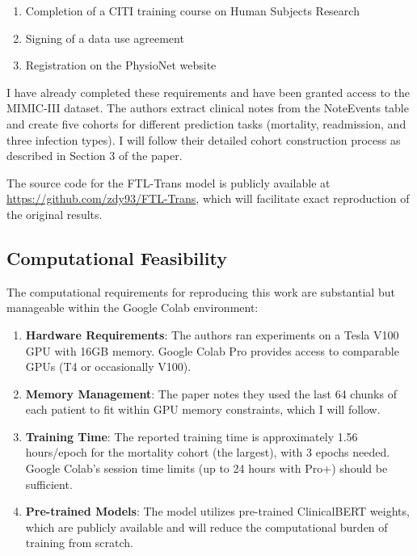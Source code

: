 \documentclass[10pt,letterpaper,twocolumn]{article}
\begin{document}
\begin{enumerate}[leftmargin=*]
    \item Completion of a CITI training course on Human Subjects Research
    \item Signing of a data use agreement
    \item Registration on the PhysioNet website
\end{enumerate}

I have already completed these requirements and have been granted access to the MIMIC-III dataset. The authors extract clinical notes from the NoteEvents table and create five cohorts for different prediction tasks (mortality, readmission, and three infection types). I will follow their detailed cohort construction process as described in Section 3 of the paper.

The source code for the FTL-Trans model is publicly available at \url{https://github.com/zdy93/FTL-Trans}, which will facilitate exact reproduction of the original results.

\subsection{Computational Feasibility}

The computational requirements for reproducing this work are substantial but manageable within the Google Colab environment:

\begin{enumerate}[leftmargin=*]
    \item \textbf{Hardware Requirements}: The authors ran experiments on a Tesla V100 GPU with 16GB memory. Google Colab Pro provides access to comparable GPUs (T4 or occasionally V100).
    
    \item \textbf{Memory Management}: The paper notes they used the last 64 chunks of each patient to fit within GPU memory constraints, which I will follow.
    
    \item \textbf{Training Time}: The reported training time is approximately 1.56 hours/epoch for the mortality cohort (the largest), with 3 epochs needed. Google Colab's session time limits (up to 24 hours with Pro+) should be sufficient.
    
    \item \textbf{Pre-trained Models}: The model utilizes pre-trained ClinicalBERT weights, which are publicly available and will reduce the computational burden of training from scratch.
\end{enumerate}
\end{document}
